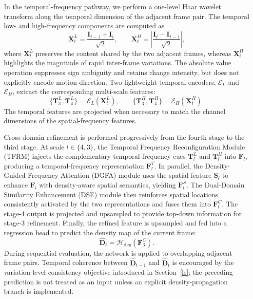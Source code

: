 \documentclass[lettersize,journal]{IEEEtran}
\begin{document}
In the temporal-frequency pathway, we perform a one-level Haar wavelet transform along the temporal dimension of the adjacent frame pair. The temporal low- and high-frequency components are computed as
\begin{equation}
\mathbf{X}_{t}^{L}
=
\frac{\mathbf{I}_{t-1}+\mathbf{I}_{t}}{\sqrt{2}},
\qquad
\mathbf{X}_{t}^{H}
=
\left|
\frac{\mathbf{I}_{t}-\mathbf{I}_{t-1}}{\sqrt{2}}
\right|,
\label{eq:dwt_t}
\end{equation}
where $\mathbf{X}_{t}^{L}$ preserves the content shared by the two adjacent frames, whereas $\mathbf{X}_{t}^{H}$ highlights the magnitude of rapid inter-frame variations. The absolute value operation suppresses sign ambiguity and retains change intensity, but does not explicitly encode motion direction. Two lightweight temporal encoders, $\mathcal{E}_{L}$ and $\mathcal{E}_{H}$, extract the corresponding multi-scale features:
\begin{equation}
\{\mathbf{T}_{3}^{L},\mathbf{T}_{4}^{L}\}
=
\mathcal{E}_{L}(\mathbf{X}_{t}^{L}),
\qquad
\{\mathbf{T}_{3}^{H},\mathbf{T}_{4}^{H}\}
=
\mathcal{E}_{H}(\mathbf{X}_{t}^{H}).
\end{equation}
The temporal features are projected when necessary to match the channel dimensions of the spatial-frequency features.

Cross-domain refinement is performed progressively from the fourth stage to the third stage. At scale $l\in\{4,3\}$, the Temporal Frequency Reconfiguration Module (TFRM) injects the complementary temporal-frequency cues $\mathbf{T}_{l}^{L}$ and $\mathbf{T}_{l}^{H}$ into $\mathbf{F}_{l}$, producing a temporal-frequency representation $\mathbf{F}_{l}^{T}$. In parallel, the Density-Guided Frequency Attention (DGFA) module uses the spatial feature $\mathbf{S}_{l}$ to enhance $\mathbf{F}_{l}$ with density-aware spatial semantics, yielding $\mathbf{F}_{l}^{S}$. The Dual-Domain Similarity Enhancement (DSE) module then reinforces spatial locations consistently activated by the two representations and fuses them into $\mathbf{F}_{l}^{C}$. The stage-4 output is projected and upsampled to provide top-down information for stage-3 refinement. Finally, the refined feature is upsampled and fed into a regression head to predict the density map of the current frame:
\begin{equation}
\hat{\mathbf{D}}_{t}
=
\mathcal{H}_{\mathrm{den}}(\mathbf{F}_{3}^{C}).
\end{equation}
During sequential evaluation, the network is applied to overlapping adjacent frame pairs. Temporal coherence between $\hat{\mathbf{D}}_{t-1}$ and $\hat{\mathbf{D}}_{t}$ is encouraged by the variation-level consistency objective introduced in Section~\ref{ls}; the preceding prediction is not treated as an input unless an explicit density-propagation branch is implemented.
\end{document}
